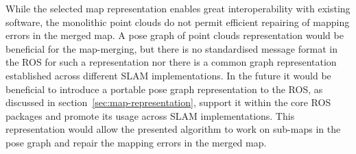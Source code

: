 While the selected map representation enables great interoperability with existing software, the monolithic point clouds do not permit efficient repairing of mapping errors in the merged map. A pose graph of point clouds representation would be beneficial for the map-merging, but there is no standardised message format in the \gls{ROS} for such a representation nor there is a common graph representation established across different \gls{SLAM} implementations. In the future it would be beneficial to introduce a portable pose graph representation to the \gls{ROS}, as discussed in section~\ref{sec:map-representation}, support it within the core \gls{ROS} packages and promote its usage across \gls{SLAM} implementations. This representation would allow the presented algorithm to work on sub-maps in the pose graph and repair the mapping errors in the merged map.
